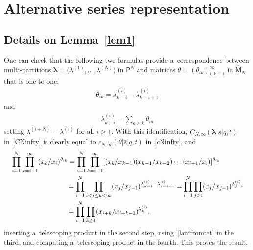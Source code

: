 \documentclass[11pt]{article}
\numberwithin{equation}{section}
\newcommand{\vlam}{\boldsymbol{\lambda}}
\newcommand{\bs}{\bar{s}}
\begin{document}
\setcounter{section}{5}
\setcounter{subsection}{0}
\setcounter{subsubsection}{0}
\setcounter{Theorem}{0}
\setcounter{equation}{0}
\appendix

\section{Alternative series representation}
\label{app:proof}

\setcounter{section}{1}
\setcounter{subsection}{0}
\setcounter{subsubsection}{0}
\setcounter{Theorem}{0}
\setcounter{equation}{0}
\subsection[Details on Lemma~3.5]{Details on Lemma~\ref{lem1}}\label{app:prooflem1}
One can check that the following two formulas provide a~correspondence between multi-partitions $\vlam=\big(\lambda^{(1)},\dots,\lambda^{(N)}\big)$ in $\mathsf{P}^N$ and matrices $\theta=(\theta_{ik})_{i,k=1}^\infty$ in $\hat{\mathsf{M}}_N$ that is one-to-one:
\begin{gather*}
\theta_{ik} = \lambda^{(i)}_{k-i}-\lambda^{(i)}_{k-i+1}
\end{gather*}
and
\begin{gather}\label{lamfromtet}
\lambda^{(i)}_{k-i} = \sum_{a\geq k}\theta_{ia}
\end{gather}
setting $\lambda^{(i+N)}=\lambda^{(i)}$ for all $i\geq 1$. With this identification, $C_{N,\infty}(\vlam|\bs|q,t)$ in~\eqref{CNinfty} is clearly equal to $c_{N,\infty}(\theta|\bs|q,t)$ in~\eqref{cNinfty}, and
\begin{gather*}
\begin{split}
&\prod_{i=1}^N \prod_{k=i+1}^\infty (x_k/x_i)^{\theta_{ik}} = \prod_{i=1}^N \prod_{k=i+1}^\infty [(x_k/x_{k-1})(x_{k-1}/x_{k-2})\cdots (x_{i+1}/x_i)]^{\theta_{ik}}
\\ &\hphantom{\prod_{i=1}^N \prod_{k=i+1}^\infty (x_k/x_i)^{\theta_{ik}}}
{}= \prod_{i=1}^N \prod_{i<j\leq k<\infty} (x_j/x_{j-1})^{ \lambda^{(i)}_{k-i}-\lambda^{(i)}_{k-i+1}}
 = \prod_{i=1}^N \prod_{j>i} (x_j/x_{j-1})^{\lambda^{(i)}_{j-i}}
\\ &\hphantom{\prod_{i=1}^N \prod_{k=i+1}^\infty (x_k/x_i)^{\theta_{ik}}}
{}= \prod_{i=1}^N \prod_{k\geq 1}(x_{i+k}/x_{i+k-1})^{\lambda^{(i)}_k},
\end{split}
\end{gather*}
inserting a~telescoping product in the second step, using~\eqref{lamfromtet} in the third, and computing a~telescoping product in the fourth. This proves the result.
\end{document}
